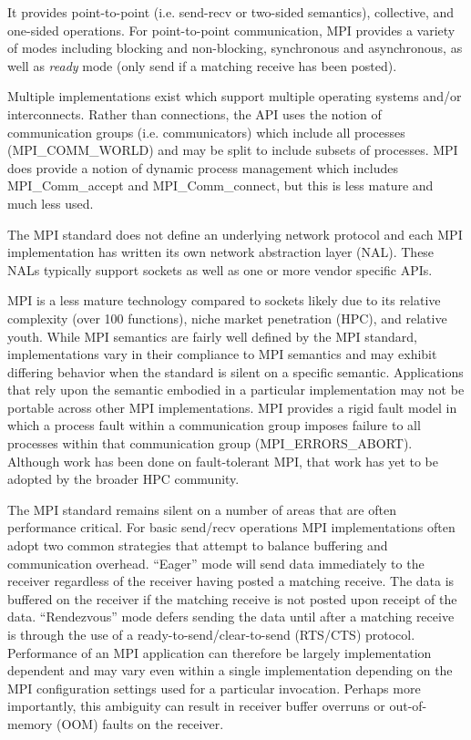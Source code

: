 It provides point-to-point (i.e. send-recv or two-sided semantics), collective, and
one-sided operations. For point-to-point communication, MPI provides a variety of modes
including blocking and non-blocking, synchronous and asynchronous, as well as \emph{ready}
mode (only send if a matching receive has been posted).

Multiple implementations exist\cite{ompi_04_pvmmpi_overview, MPICH2_URL, mvapich, intel-mpi, platform-mpi}
which support multiple operating systems and/or interconnects.  Rather than connections,
the API uses the notion of communication groups (i.e.  communicators) which include all
processes (MPI\_COMM\_WORLD) and may be split to include subsets of processes. MPI does
provide a notion of dynamic process management which includes MPI\_Comm\_accept and
MPI\_Comm\_connect, but this is less mature and much less used.

The MPI standard does not define an underlying network protocol and each MPI
implementation has written its own network abstraction layer (NAL). These NALs typically
support sockets as well as one or more vendor specific APIs.

MPI is a less mature technology compared to sockets likely due to its
relative complexity (over 100 functions), niche market penetration
(HPC), and relative youth. While MPI semantics are fairly well defined
by the MPI standard, implementations vary in their compliance to MPI
semantics and may exhibit differing behavior when the standard is
silent on a specific semantic. Applications that rely upon the
semantic embodied in a particular implementation may not be portable
across other MPI implementations. MPI provides a rigid fault model in
which a process fault within a communication group imposes failure to
all processes within that communication group
(MPI\_ERRORS\_ABORT). Although work has been done on fault-tolerant
MPI\cite{fagg04:_fault_toler_commun_librar_applic_high_perof, mpi-ft}, that work has yet to be adopted by the
broader HPC community. 

The MPI standard remains silent on a number of areas that are
often performance critical. For basic send/recv operations MPI
implementations often adopt two common strategies that attempt to
balance buffering and communication overhead. ``Eager'' mode will send
data immediately to the receiver regardless of the receiver having
posted a matching receive. The data is buffered on the receiver if the
matching receive is not posted upon receipt of the
data. ``Rendezvous'' mode defers sending the data until after a
matching receive is through the use of a ready-to-send/clear-to-send
(RTS/CTS) protocol. Performance of an MPI application can therefore be
largely implementation dependent and may vary even within a single
implementation depending on the MPI configuration settings used for a
particular invocation. Perhaps more importantly, this ambiguity can
result in receiver buffer overruns or out-of-memory (OOM) faults on
the receiver. 

